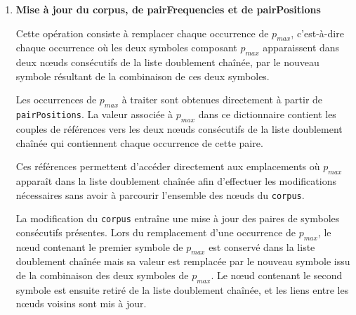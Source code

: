 \documentclass[12pt,a4paper]{report}
\begin{document}
\begin{enumerate}
\begin{enumerate}[label=\alph*)]
\begin{verbatim}
	 			(tokenPositions at: aToken token ) size = 0
	 					ifTrue: [ tokenPositions removeKey: aToken token ]
	 	\end{verbatim}
	 	
	 	Cette méthode reçoit en paramètre un objet de la classe \texttt{Token}, correspondant à l'une des occurrences d'un symbole composant $p_{max}$ qui doit disparaître après la fusion.
	 	
	 	Elle récupère tout d'abord le symbole stocké dans la variable d'instance \texttt{token} de cet objet. Elle décrémente ensuite dans \texttt{tokenFrequencies} la fréquence associée à ce symbole de la valeur stockée dans la variable d'instance \texttt{occurence} de l'objet \texttt{Token}. Cette diminution correspond à la suppression de cette occurrence du symbole dans le corpus après la fusion.
	 	
	 	La méthode supprime également, de la valeur associée au symbole dans \texttt{tokenPositions}, la référence stockée dans la variable d'instance \texttt{position} de l'objet \texttt{Token}. Cette référence correspond au nœud de la liste doublement chaînée contenant cette occurrence du symbole.
	 	
	 	\item \textbf{Mise à jour du corpus, de pairFrequencies et de pairPositions}
	 	
	 	Cette opération consiste à remplacer chaque occurrence de $p_{max}$, c’est-à-dire chaque occurrence où les deux symboles composant $p_{max}$ apparaissent dans deux nœuds consécutifs de la liste doublement chaînée, par le nouveau symbole résultant de la combinaison de ces deux symboles.
	 	
	 	Les occurrences de $p_{max}$ à traiter sont obtenues directement à partir de \texttt{pairPositions}. La valeur associée à $p_{max}$ dans ce dictionnaire contient les couples de références vers les deux nœuds consécutifs de la liste doublement chaînée qui contiennent chaque occurrence de cette paire.
	 	
	 	Ces références permettent d’accéder directement aux emplacements où $p_{max}$ apparaît dans la liste doublement chaînée afin d’effectuer les modifications nécessaires sans avoir à parcourir l’ensemble des nœuds du \texttt{corpus}.
	 	
	 	La modification du \texttt{corpus} entraîne une mise à jour des paires de symboles consécutifs présentes. Lors du remplacement d’une occurrence de $p_{max}$, le nœud contenant le premier symbole de $p_{max}$ est conservé dans la liste doublement chaînée mais sa valeur est remplacée par le nouveau symbole issu de la combinaison des deux symboles de $p_{max}$. Le nœud contenant le second symbole est ensuite retiré de la liste doublement chaînée, et les liens entre les nœuds voisins sont mis à jour.
	 	

\end{enumerate}
\end{enumerate}
\end{document}
